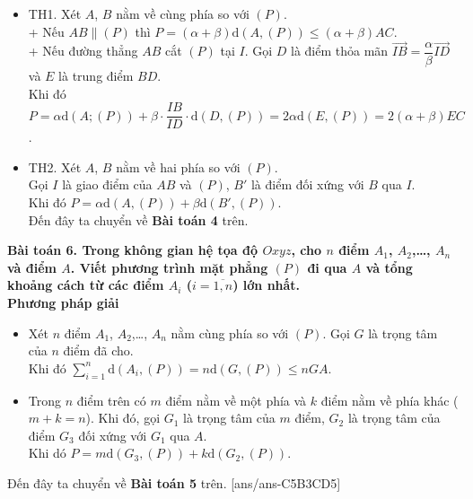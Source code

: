 \begin{itemize}
	\item TH1. Xét  $A$, $B$ nằm về cùng phía so với $(P)$.\\
	+ Nếu $AB\parallel (P)$ thì $P=\left(\alpha+\beta\right)\mathrm{d}(A,(P))\le \left(\alpha+\beta\right)AC$.\\
	+ Nếu đường thẳng $AB$ cắt $(P)$ tại $I$. Gọi $D$ là điểm thỏa mãn $\overrightarrow{IB}=\dfrac{\alpha}{\beta}\overrightarrow{ID}$ và $E$ là trung điểm $BD$.\\
	Khi đó $P=\alpha \mathrm{d}(A;(P))+\beta\cdot \dfrac{IB}{ID}\cdot \mathrm{d}(D,(P))=2\alpha \mathrm{d}(E,(P))=2\left(\alpha+\beta\right)EC$.
	\item TH2. Xét $A$, $B$ nằm về hai phía so với $(P)$.\\
	Gọi $I$ là giao điểm của $AB$ và $(P)$, $B'$ là điểm đối xứng với $B$ qua $I$.\\ 
	Khi đó $P=\alpha \mathrm{d}(A,(P))+\beta \mathrm{d}(B',(P))$.\\
	Đến đây ta chuyển về {\bf Bài toán 4} trên.
\end{itemize}
{\bf Bài toán 6. Trong không gian hệ tọa độ $Oxyz$, cho $n$ điểm $A_1$, $A_2$,\ldots, $A_n$ và điểm $A$. Viết phương trình mặt phẳng $(P)$ đi qua $A$ và tổng khoảng cách từ các điểm $A_i$ ($i=\overline{1,n}$) lớn nhất.}\\
{\bf Phương pháp giải}
\begin{itemize}
	\item Xét $n$ điểm $A_1$, $A_2$,\ldots, $A_n$ nằm cùng phía so với $(P)$. Gọi $G$ là trọng tâm của $n$ điểm đã cho.\\ 
	Khi đó $\sum\limits_{i=1}^{n}\mathrm{d}(A_i,(P))=n\mathrm{d}(G,(P))\le n GA$.
	\item Trong $n$ điểm trên có $m$ điểm nằm về một phía và $k$ điểm nằm về phía khác ($m+k=n$). Khi đó, gọi $G_1$ là trọng tâm của $m$ điểm, $G_2$ là trọng tâm của  điểm $G_3$ đối xứng với $G_1$ qua $A$.\\
	Khi dó $P=m \mathrm{d}(G_3,(P))+k\mathrm{d}(G_2,(P))$.
\end{itemize}
Đến đây ta chuyển về {\bf Bài toán 5} trên.
[ans/ans-C5B3CD5]
\TN
